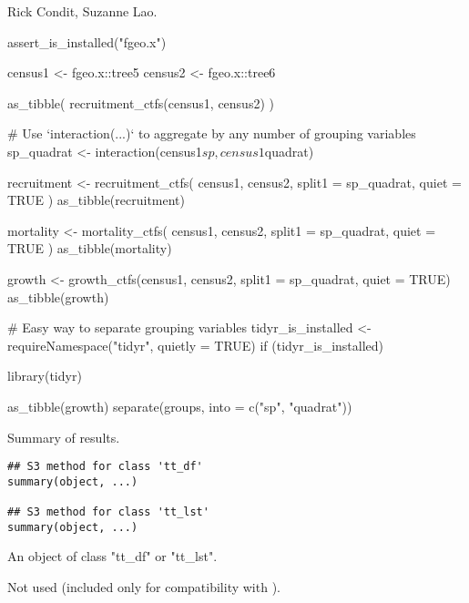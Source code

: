 \documentclass[a4paper]{book}
\begin{document}
%
\begin{Author}\relax
Rick Condit, Suzanne Lao.
\end{Author}
%
\begin{Examples}
\begin{ExampleCode}
assert_is_installed("fgeo.x")

census1 <- fgeo.x::tree5
census2 <- fgeo.x::tree6

as_tibble(
  recruitment_ctfs(census1, census2)
)

# Use `interaction(...)` to aggregate by any number of grouping variables
sp_quadrat <- interaction(census1$sp, census1$quadrat)

recruitment <- recruitment_ctfs(
  census1, census2,
  split1 = sp_quadrat,
  quiet = TRUE
)
as_tibble(recruitment)

mortality <- mortality_ctfs(
  census1, census2,
  split1 = sp_quadrat, quiet = TRUE
)
as_tibble(mortality)

growth <- growth_ctfs(census1, census2, split1 = sp_quadrat, quiet = TRUE)
as_tibble(growth)

# Easy way to separate grouping variables
tidyr_is_installed <- requireNamespace("tidyr", quietly = TRUE)
if (tidyr_is_installed) {
  library(tidyr)

  as_tibble(growth) %
    separate(groups, into = c("sp", "quadrat"))
}
\end{ExampleCode}
\end{Examples}
%
\begin{Description}\relax
Summary of  results.
\end{Description}
%
\begin{Usage}
\begin{verbatim}
## S3 method for class 'tt_df'
summary(object, ...)

## S3 method for class 'tt_lst'
summary(object, ...)
\end{verbatim}
\end{Usage}
%
\begin{Arguments}
\begin{ldescription}
\item[\code{object}] An object of class "tt\_df" or "tt\_lst".

\item[\code{...}] Not used (included only for compatibility with ).
\end{ldescription}
\end{Arguments}
\end{document}
